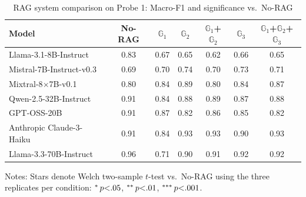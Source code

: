 \begin{table}[t]
  \centering
  \small
    \caption{RAG system comparison on {Probe 1}: Macro-F1 and significance vs.\ No-RAG}
    \label{tab:rag_probe1}
    \begin{tabular}{lcccccc}
      \toprule
      \textbf{Model} & \textbf{No-RAG} & $\mathbb{G}_1$ & $\mathbb{G}_2$ & $\mathbb{G}_1$+$\mathbb{G}_2$ & $\mathbb{G}_3$ & $\mathbb{G}_1$+$\mathbb{G}_2$+$\mathbb{G}_3$ \\
      \midrule
      Llama-3.1-8B-Instruct    & 0.83 & 0.67\sym{***} & 0.65\sym{**}  & 0.62\sym{***} & 0.66\sym{***} & 0.65 \\
      Mistral-7B-Instruct-v0.3 & 0.69 & 0.70           & 0.74          & 0.70           & 0.73           & 0.71 \\
      Mixtral-8$\times$7B-v0.1 & 0.80 & 0.84           & 0.89\sym{**}  & 0.80           & 0.84           & 0.87\sym{*} \\
      Qwen-2.5-32B-Instruct    & 0.91 & 0.84\sym{*}    & 0.88          & 0.89           & 0.87\sym{*}    & 0.88 \\
      GPT-OSS-20B              & 0.91 & 0.87           & 0.82\sym{*}   & 0.86\sym{*}    & 0.85\sym{*}    & 0.82 \\
      Anthropic Claude-3-Haiku & 0.91 & 0.84           & 0.93          & 0.93           & 0.90           & 0.93 \\
      Llama-3.3-70B-Instruct   & 0.96 & 0.71\sym{***}  & 0.90\sym{**}  & 0.91\sym{*}    & 0.92\sym{*}    & 0.92\sym{**} \\
      \bottomrule
    \end{tabular}

      \footnotesize
      Notes: Stars denote Welch two-sample $t$-test vs.\ No-RAG using the three replicates per condition:
      \;$\sym{*}\,p{<}.05$, \;$\sym{**}\,p{<}.01$, \;$\sym{***}\,p{<}.001$.

\end{table}


